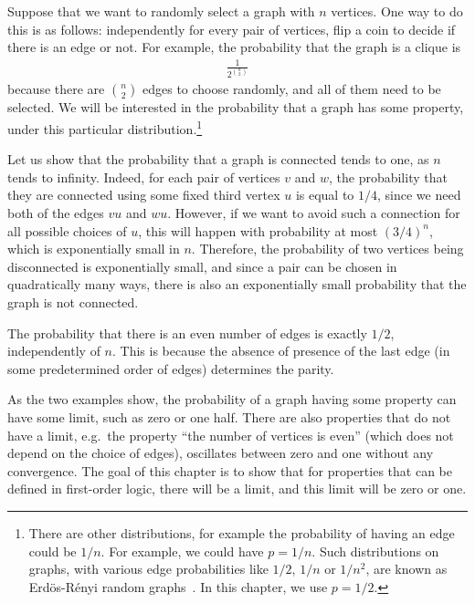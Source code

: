 \label{sec:zero-one-laws}


Suppose that we want to randomly select a graph with $n$ vertices. One way to do this is as follows: independently for every pair of vertices, flip a coin to decide if there is an edge or not.
For example, the probability that the graph is a clique is 
\begin{align*}
\frac 1 {2^{n \choose 2}}
\end{align*}
because there are $n \choose 2$ edges to choose randomly, and  all of them need to be selected. We will be interested in the probability that a graph has some property, under this particular distribution.\footnote{There are other distributions, for example the probability of having an edge could be $1/n$. For example, we could have $p = 1/n$. Such distributions on graphs, with various edge probabilities like $1/2$, $1/n$ or $1/n^2$, are known as Erd\"os-R\'enyi random graphs~\cite{erdds1959random}. In this chapter, we use $p=1/2$. } 

\begin{example}[Connectivity] \label{ex:random-connectivity} Let us show that the probability that a graph is connected tends to one, as $n$ tends to infinity.  Indeed, for each pair of vertices $v$ and $w$, the probability that they are connected using some fixed third vertex $u$ is equal to $1/4$, since we need both of the edges $vu$ and $wu$. However, if we want to avoid such a connection for all possible choices of $u$, this will happen with probability at most $(3/4)^n$, which is exponentially small in $n$.  Therefore, the probability of two vertices being disconnected is exponentially small, and since a pair can be chosen in quadratically many ways, there is also an exponentially small probability that the graph is not connected.
\end{example}

\begin{example}[Parity] \label{ex:random-parity}
The probability that there is an even number of edges is exactly $1/2$, independently of $n$. This is because the absence of presence of the  last edge (in some predetermined order of edges) determines the parity. 
\end{example}

As the two examples show, the probability of a graph having some property can have some limit, such as zero or one half. There are also properties that do not have a limit, e.g.~the property ``the number of vertices is even'' (which does not depend on the choice of edges), oscillates between zero and one without any convergence. The goal of this chapter is to show that for properties that can be defined in first-order logic, there will be a limit, and this limit will be zero or one.

